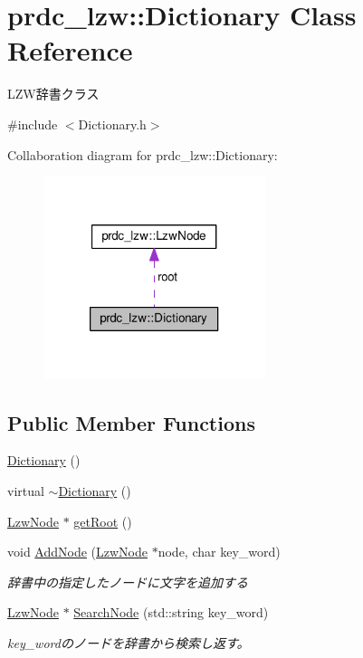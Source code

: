 \hypertarget{classprdc__lzw_1_1Dictionary}{\section{prdc\-\_\-lzw\-:\-:Dictionary Class Reference}
\label{classprdc__lzw_1_1Dictionary}
}


L\-Z\-W辞書クラス  




{\ttfamily \#include $<$Dictionary.\-h$>$}



Collaboration diagram for prdc\-\_\-lzw\-:\-:Dictionary\-:\nopagebreak
\begin{figure}[H]
\begin{center}
\leavevmode
\includegraphics[width=184pt]{classprdc__lzw_1_1Dictionary__coll__graph}
\end{center}
\end{figure}
\subsection*{Public Member Functions}
\begin{DoxyCompactItemize}
\item 
\hyperlink{classprdc__lzw_1_1Dictionary_a7a53efd7967e59748f321938aa983368}{Dictionary} ()
\item 
virtual \hyperlink{classprdc__lzw_1_1Dictionary_a953fce0e9128a8e48b62779fdefcc051}{$\sim$\-Dictionary} ()
\item 
\hyperlink{classprdc__lzw_1_1LzwNode}{Lzw\-Node} $\ast$ \hyperlink{classprdc__lzw_1_1Dictionary_a4ac9a03c8ead8d6ca17e080ff9227fd9}{get\-Root} ()
\item 
void \hyperlink{classprdc__lzw_1_1Dictionary_ad9a68c58a75d9eec5eb2aaf528b9fbe4}{Add\-Node} (\hyperlink{classprdc__lzw_1_1LzwNode}{Lzw\-Node} $\ast$node, char key\-\_\-word)
\begin{DoxyCompactList}\small\item\em 辞書中の指定したノードに文字を追加する \end{DoxyCompactList}\item 
\hyperlink{classprdc__lzw_1_1LzwNode}{Lzw\-Node} $\ast$ \hyperlink{classprdc__lzw_1_1Dictionary_ac5577ef2e482e191a0b6376e28564b7e}{Search\-Node} (std\-::string key\-\_\-word)
\begin{DoxyCompactList}\small\item\em key\-\_\-wordのノードを辞書から検索し返す。 \end{DoxyCompactList}\end{DoxyCompactItemize}
